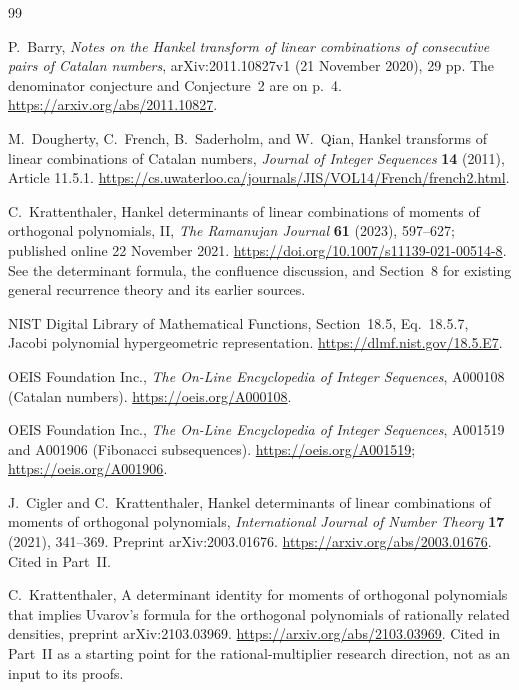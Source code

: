 \documentclass[11pt,a4paper]{article}
\numberwithin{equation}{section}
\theoremstyle{definition}
\theoremstyle{remark}
\begin{document}
\clearpage
\begin{thebibliography}{99}

P.~Barry,
\emph{Notes on the Hankel transform of linear combinations of consecutive
pairs of Catalan numbers}, arXiv:2011.10827v1 (21 November 2020), 29 pp.
The denominator conjecture and Conjecture~2 are on p.~4.
\url{https://arxiv.org/abs/2011.10827}.

M.~Dougherty, C.~French, B.~Saderholm, and W.~Qian,
Hankel transforms of linear combinations of Catalan numbers,
\emph{Journal of Integer Sequences} \textbf{14} (2011), Article 11.5.1.
\url{https://cs.uwaterloo.ca/journals/JIS/VOL14/French/french2.html}.

C.~Krattenthaler,
Hankel determinants of linear combinations of moments of orthogonal
polynomials, II,
\emph{The Ramanujan Journal} \textbf{61} (2023), 597--627;
published online 22 November 2021.
\url{https://doi.org/10.1007/s11139-021-00514-8}.
See the determinant formula, the confluence discussion, and Section~8
for existing general recurrence theory and its earlier sources.

NIST Digital Library of Mathematical Functions,
Section~18.5, Eq.~18.5.7, Jacobi polynomial hypergeometric representation.
\url{https://dlmf.nist.gov/18.5.E7}.

OEIS Foundation Inc., \emph{The On-Line Encyclopedia of Integer Sequences},
A000108 (Catalan numbers).
\url{https://oeis.org/A000108}.

OEIS Foundation Inc., \emph{The On-Line Encyclopedia of Integer Sequences},
A001519 and A001906 (Fibonacci subsequences).
\url{https://oeis.org/A001519}; \url{https://oeis.org/A001906}.

J.~Cigler and C.~Krattenthaler,
Hankel determinants of linear combinations of moments of orthogonal
polynomials,
\emph{International Journal of Number Theory} \textbf{17} (2021), 341--369.
Preprint arXiv:2003.01676.
\url{https://arxiv.org/abs/2003.01676}.
Cited in Part~II.

C.~Krattenthaler,
A determinant identity for moments of orthogonal polynomials that
implies Uvarov's formula for the orthogonal polynomials of rationally
related densities, preprint arXiv:2103.03969.
\url{https://arxiv.org/abs/2103.03969}.
Cited in Part~II as a starting point for the rational-multiplier research
direction, not as an input to its proofs.


\end{thebibliography}
\end{document}
